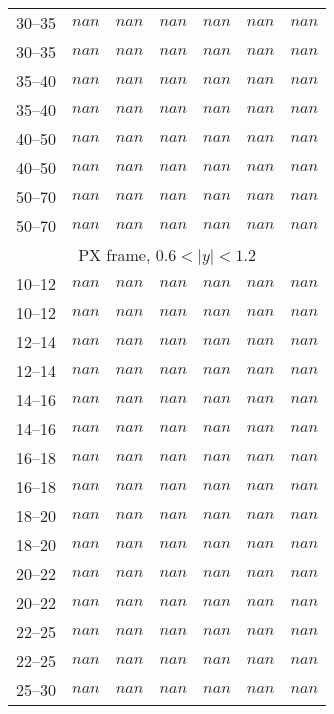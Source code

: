 \documentclass{article}
\begin{document}
\begin{table}[!h]
\begin{tabular}{|c|cccccc|}
30--35   &  $nan$  & $nan$  &  $nan$ &  $nan$  & $nan$  &  $nan$ \\
30--35   &  $nan$  & $nan$  &  $nan$ &  $nan$  & $nan$  &  $nan$ \\
35--40   &  $nan$  & $nan$  &  $nan$ &  $nan$  & $nan$  &  $nan$ \\
35--40   &  $nan$  & $nan$  &  $nan$ &  $nan$  & $nan$  &  $nan$ \\
40--50   &  $nan$  & $nan$  &  $nan$ &  $nan$  & $nan$  &  $nan$ \\
40--50   &  $nan$  & $nan$  &  $nan$ &  $nan$  & $nan$  &  $nan$ \\
50--70   &  $nan$  & $nan$  &  $nan$ &  $nan$  & $nan$  &  $nan$ \\
50--70   &  $nan$  & $nan$  &  $nan$ &  $nan$  & $nan$  &  $nan$ \\
\hline \multicolumn{7}{|c|}{PX frame, $0.6 < |y| < 1.2$}\\ \hline \rule{0pt}{4mm}
10--12   &  $nan$  & $nan$  &  $nan$ &  $nan$  & $nan$  &  $nan$ \\
10--12   &  $nan$  & $nan$  &  $nan$ &  $nan$  & $nan$  &  $nan$ \\
12--14   &  $nan$  & $nan$  &  $nan$ &  $nan$  & $nan$  &  $nan$ \\
12--14   &  $nan$  & $nan$  &  $nan$ &  $nan$  & $nan$  &  $nan$ \\
14--16   &  $nan$  & $nan$  &  $nan$ &  $nan$  & $nan$  &  $nan$ \\
14--16   &  $nan$  & $nan$  &  $nan$ &  $nan$  & $nan$  &  $nan$ \\
16--18   &  $nan$  & $nan$  &  $nan$ &  $nan$  & $nan$  &  $nan$ \\
16--18   &  $nan$  & $nan$  &  $nan$ &  $nan$  & $nan$  &  $nan$ \\
18--20   &  $nan$  & $nan$  &  $nan$ &  $nan$  & $nan$  &  $nan$ \\
18--20   &  $nan$  & $nan$  &  $nan$ &  $nan$  & $nan$  &  $nan$ \\
20--22   &  $nan$  & $nan$  &  $nan$ &  $nan$  & $nan$  &  $nan$ \\
20--22   &  $nan$  & $nan$  &  $nan$ &  $nan$  & $nan$  &  $nan$ \\
22--25   &  $nan$  & $nan$  &  $nan$ &  $nan$  & $nan$  &  $nan$ \\
22--25   &  $nan$  & $nan$  &  $nan$ &  $nan$  & $nan$  &  $nan$ \\
25--30   &  $nan$  & $nan$  &  $nan$ &  $nan$  & $nan$  &  $nan$ \\

\end{tabular}
\end{table}
\end{document}

